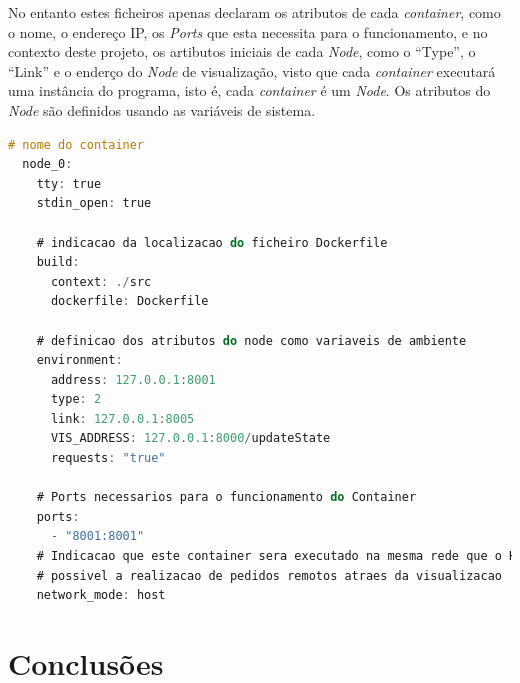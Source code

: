 No entanto estes ficheiros apenas declaram os atributos de cada \emph{container}, como o nome, o endereço \acs{IP}, os \emph{Ports} que esta necessita para o funcionamento, e no contexto deste projeto, os artibutos iniciais de cada \emph{Node}, como o ``Type'', o 
``Link'' e o enderço do \emph{Node} de visualização, visto que cada \emph{container} executará uma instância do programa, isto é, cada \emph{container} é um \emph{Node}. Os atributos do \emph{Node} são definidos usando as variáveis de sistema.


\begin{lstlisting}[caption={Iteração pelo ``Map'' ``Nodes'', instanciação do objeto e adicionado à lista },language=C]
  # nome do container
  node_0:
    tty: true
    stdin_open: true

    # indicacao da localizacao do ficheiro Dockerfile
    build:
      context: ./src
      dockerfile: Dockerfile

    # definicao dos atributos do node como variaveis de ambiente
    environment:
      address: 127.0.0.1:8001
      type: 2 
      link: 127.0.0.1:8005
      VIS_ADDRESS: 127.0.0.1:8000/updateState
      requests: "true"

    # Ports necessarios para o funcionamento do Container
    ports:
      - "8001:8001"
    # Indicacao que este container sera executado na mesma rede que o Host, isto para que seja
    # possivel a realizacao de pedidos remotos atraes da visualizacao
    network_mode: host
\end{lstlisting}





\section{Conclusões}
